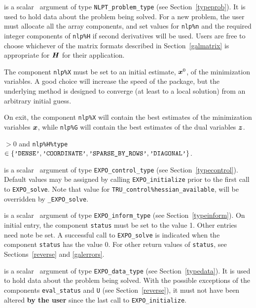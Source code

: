 \documentclass{galahad}
\newcommand{\packagename}{EXPO}
\newcommand{\fullpackagename}{\libraryname\_\packagename}
\newcommand{\solver}{{\tt \fullpackagename\_solve}}
\begin{document}
\vspace*{-2mm}
\begin{description}
 is a scalar \intentinout\ argument of type
{\tt NLPT\_problem\_type}
(see Section~\ref{typeprob}).
It is used to hold data about the problem being solved.
For a new problem, the user must allocate all the array components,
and set values for {\tt nlp\%n}
and the required integer components of {\tt nlp\%H} if second derivatives
will be used.
Users are free to choose whichever
of the matrix formats described in Section~\ref{galmatrix}
is appropriate for ${\bm{H}}$ for their application.

\noindent
The component {\tt nlp\%X} must be set to an initial estimate, ${\bm{x}}^{0}$,
of the minimization variables. A good choice will increase the speed
of the package, but the underlying method is designed to converge (at least
to a local solution) from an arbitrary initial guess.

\noindent
On exit, the component {\tt nlp\%X} will contain the best estimates of the
minimization variables ${\bm{x}}$, while {\tt nlp\%G} will contain the best 
estimates of the dual variables ${\bm{z}}$.

\noindent
{} $> 0$ and
{\tt nlp\%H\%type} $\in \{
  \mbox{\tt 'DENSE'}, \mbox{\tt 'COORDINATE'}, \mbox{\tt 'SPARSE\_BY\_ROWS'},
  \mbox{\tt 'DIAGONAL'} \}$.

 is a scalar \intentin\ argument of type
{\tt \packagename\_control\_type}
(see Section~\ref{typecontrol}). Default values may be assigned by calling
{\tt \packagename\_initialize} prior to the first call to
{\tt \packagename\_solve}. 
Note that value for {\tt TRU\_control\%\-hessian\_available},
will be overridden by \solver.

 is a scalar \intentinout\ argument of type
{\tt \packagename\_inform\_type}
(see Section~\ref{typeinform}).
On initial entry, the  component {\tt status} must be set to the value 1.
Other entries need note be set.
A successful call to
{\tt \packagename\_solve}
is indicated when the  component {\tt status} has the value 0.
For other return values of {\tt status}, see Sections~\ref{reverse} and
\ref{galerrors}.

 is a scalar \intentinout\ argument of type
{\tt \packagename\_data\_type}
(see Section~\ref{typedata}). It is used to hold data about the problem being
solved. With the possible exceptions of the components
{\tt eval\_status} and {\tt U} (see Section~\ref{reverse}),
it must not have been altered {\bf by the user} since the last call to
{\tt \packagename\_initialize}.


\end{description}
\end{document}
